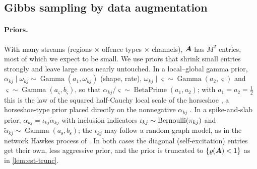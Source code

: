 \subsection{Gibbs sampling by data augmentation}\label{app:est-gibbs}

\paragraph{Priors.} With many streams (regions $\times$ offence types $\times$ channels), $\bm{A}$ has $M^2$
entries, most of which we expect to be small. We use priors that shrink small entries
strongly and leave large ones nearly untouched. In a local--global gamma prior,
$\alpha_{kj}\mid\omega_{kj}\sim\operatorname{Gamma}(a_1,\omega_{kj})$ (shape, rate),
$\omega_{kj}\mid\varsigma\sim\operatorname{Gamma}(a_2,\varsigma)$ and
$\varsigma\sim\operatorname{Gamma}(a_\varsigma,b_\varsigma)$, so that
$\alpha_{kj}/\varsigma\sim\operatorname{BetaPrime}(a_1,a_2)$; with $a_1=a_2=\tfrac12$ this is
the law of the squared half-Cauchy local scale of the horseshoe \citep{carvalho2010}, a
horseshoe-type prior placed directly on the nonnegative $\alpha_{kj}$
\citep[cf.][]{armagan2011}. In a spike-and-slab prior, $\alpha_{kj}=\iota_{kj}\tilde\alpha_{kj}$
with inclusion indicators $\iota_{kj}\sim\operatorname{Bernoulli}(\pi_{kj})$ and
$\tilde\alpha_{kj}\sim\operatorname{Gamma}(a_{\mathrm s},b_{\mathrm s})$; the $\iota_{kj}$ may
follow a random-graph model, as in the network Hawkes process of \citet{linderman2014}.
In both cases the diagonal (self-excitation) entries get their own, less aggressive prior,
and the prior is truncated to $\{\varrho(\bm{A})<1\}$ as in \cref{lem:est-trunc}.

